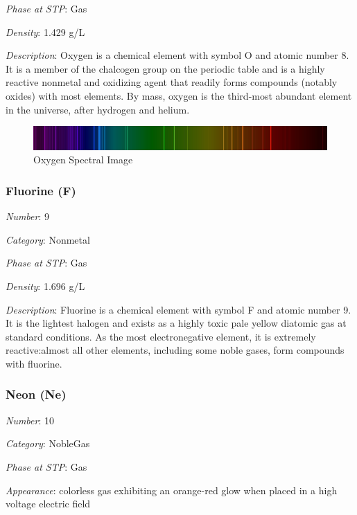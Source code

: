 \documentclass{article}
\begin{document}
\textit{Phase at STP}: Gas

\textit{Density}: 1.429 g/L

\textit{Description}: Oxygen is a chemical element with symbol O and atomic number 8. It is a member of the chalcogen group on the periodic table and is a highly reactive nonmetal and oxidizing agent that readily forms compounds (notably oxides) with most elements. By mass, oxygen is the third-most abundant element in the universe, after hydrogen and helium.

\immediate{}
\begin{figure}[!ht]
    \centering
    \includegraphics[width=12cm]{./resources/spectral_img/Oxygen_spectre.jpg}
    \caption{Oxygen Spectral Image}
\end{figure}

\hypertarget{subsubsection::F}{}\subsubsection{Fluorine (F)}

\textit{Number}: 9

\textit{Category}: Nonmetal

\textit{Phase at STP}: Gas

\textit{Density}: 1.696 g/L

\textit{Description}: Fluorine is a chemical element with symbol F and atomic number 9. It is the lightest halogen and exists as a highly toxic pale yellow diatomic gas at standard conditions. As the most electronegative element, it is extremely reactive:almost all other elements, including some noble gases, form compounds with fluorine.

\hypertarget{subsubsection::Ne}{}\subsubsection{Neon (Ne)}

\textit{Number}: 10

\textit{Category}: NobleGas

\textit{Phase at STP}: Gas

\textit{Appearance}: colorless gas exhibiting an orange-red glow when placed in a high voltage electric field
\end{document}
